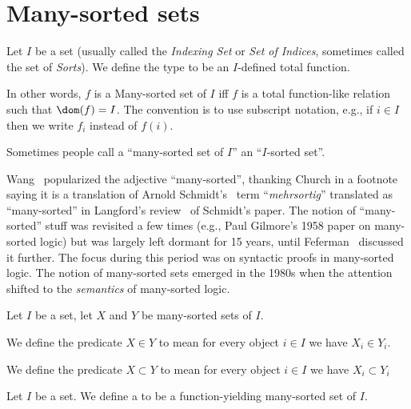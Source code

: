 
\chapter{Many-sorted sets}

\begin{definition}\label{def:pboole:many-sorted-set}
Let $I$ be a set (usually called the \emph{Indexing Set} or 
\emph{Set of Indices}, sometimes called the set of \emph{Sorts}).
We define the type  to be an
$I$-defined total function.

In other words, $f$ is a Many-sorted set of $I$ iff $f$ is a total
function-like relation such that $\dom(f)=I$. The convention is to use
subscript notation, e.g., if $i\in I$ then we write $f_{i}$ instead of $f(i)$.

Sometimes people call a ``many-sorted set of $I$'' an ``$I$-sorted set''.
\end{definition}

\begin{remark}
Wang~\cite{wang1952logic} popularized the adjective ``many-sorted'',
thanking Church in a footnote saying it is a translation of
Arnold Schmidt's~\cite{schmidt1938deduktive} term ``\textit{mehrsortig}'' translated as ``many-sorted'' in
Langford's review~\cite{langford1939arnold} of Schmidt's paper. The
notion of ``many-sorted'' stuff was revisited a few times (e.g., Paul
Gilmore's 1958 paper on many-sorted logic) but was largely left
dormant for 15 years, until Feferman~\cite{feferman1967lectures}
discussed it further. The focus during this period was on syntactic
proofs in many-sorted logic. The notion of many-sorted sets emerged in
the 1980s when the attention shifted to the \emph{semantics} of
many-sorted logic.
\end{remark}

\begin{definition}
Let $I$ be a set, let $X$ and $Y$ be many-sorted sets of $I$.

We define the predicate $X\in Y$ to mean for every object $i\in I$
we have $X_{i}\in Y_{i}$.

We define the predicate $X\subset Y$ to mean for every object $i\in I$
we have $X_{i}\subset Y_{i}$
\end{definition}

\begin{definition}\label{def:pboole:many-sorted-function}
Let $I$ be a set. We define a 
to be a function-yielding many-sorted set of $I$.
\end{definition}